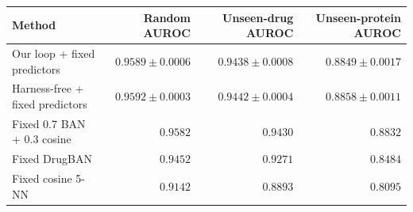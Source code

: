 \centering\footnotesize\setlength{\tabcolsep}{3pt}
\begin{tabularx}{\linewidth}{Xrrr}
\toprule
Method & Random AUROC & Unseen-drug AUROC & Unseen-protein AUROC \\
\midrule
Our loop + fixed predictors & \(0.9589 \pm 0.0006\) & \(0.9438 \pm 0.0008\) & \(0.8849 \pm 0.0017\) \\
Harness-free + fixed predictors & \(0.9592 \pm 0.0003\) & \(0.9442 \pm 0.0004\) & \(0.8858 \pm 0.0011\) \\
Fixed 0.7 BAN + 0.3 cosine & \(0.9582\) & \(0.9430\) & \(0.8832\) \\
Fixed DrugBAN & \(0.9452\) & \(0.9271\) & \(0.8484\) \\
Fixed cosine 5-NN & \(0.9142\) & \(0.8893\) & \(0.8095\) \\
\bottomrule
\end{tabularx}
\caption{DTI program search over the same fixed DrugBAN and cosine predictors. Mean and sample SD cover five research trajectories, not five base-model fits. All base training uses 50,149 rows. The manual starting combiner is shown separately; no new task weights are trained by either controller.}
\label{tab:dti-program-search}
